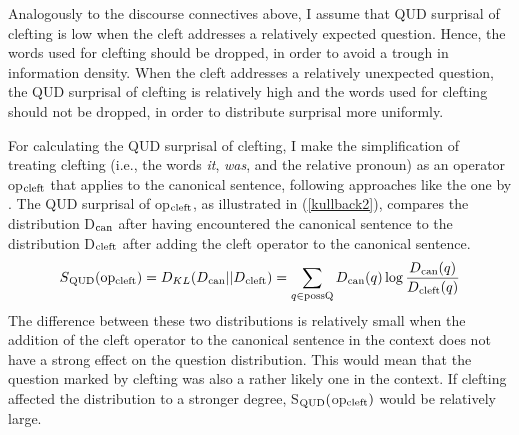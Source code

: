 \documentclass[output=paper,colorlinks,citecolor=brown]{langscibook}
\begin{document}
Analogously to the discourse connectives above, I assume that QUD surprisal of clefting is low when the cleft addresses a relatively expected question. Hence, the words used for clefting should be dropped, in order to avoid a trough in information density. When the cleft addresses a relatively unexpected question, the QUD surprisal of clefting is relatively high and the words used for clefting should not be dropped, in order to distribute surprisal more uniformly.

For calculating the QUD surprisal of clefting, I make the simplification of treating clefting (i.e., the words \textit{it}, \textit{was}, and the relative pronoun) as an operator op$\textsubscript{cleft}$ that applies to the canonical sentence, following approaches like the one by \citet{velleman_et_al_2012}. The QUD surprisal of op$\textsubscript{cleft}$, as illustrated in (\ref{kullback2}), compares the distribution D$\textsubscript{can}$ after having encountered the canonical sentence to the distribution D$\textsubscript{cleft}$ after adding the cleft operator to the canonical sentence.
\begin{equation}
    \label{kullback2} S\textsubscript{\text{QUD}}(\text{op}\textsubscript{\text{cleft}}) = D_{KL}(D\textsubscript{\text{can}}||D\textsubscript{\text{cleft}})= \sum_{q \in \text{possQ}}D\textsubscript{\text{can}}(q)\log\frac{D\textsubscript{\text{can}}(q)}{D\textsubscript{\text{cleft}}(q)}
\end{equation}
%
The difference between these two distributions is relatively small when the addition of the cleft operator to the canonical sentence in the context does not have a strong effect on the question distribution. This would mean that the question marked by clefting was also a rather likely one in the context. If clefting affected the distribution to a stronger degree, S$\textsubscript{QUD}($op$\textsubscript{cleft})$ would be relatively large.
\end{document}
